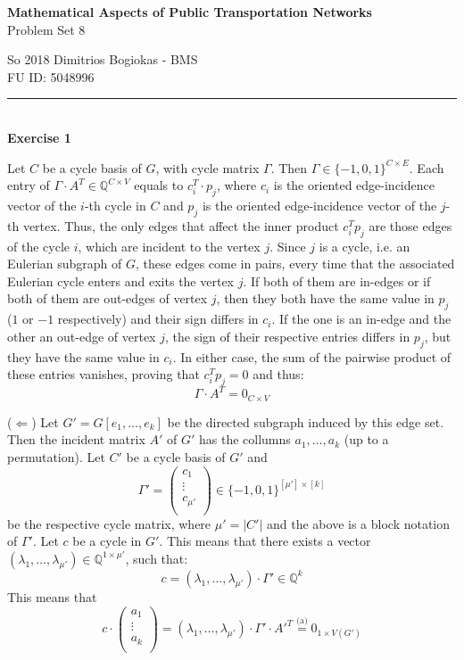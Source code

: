 \documentclass[12pt]{article}
\newenvironment{a_enum}{\begin{enumerate}[label=(\alph{*})]}{\end{enumerate}} %
\newcommand\HRule{\rule{\linewidth}{0.1mm}}
\begin{document}
\begin{center}
{\bf Mathematical Aspects of Public Transportation Networks}\\
Problem Set 8
\end{center}
So 2018 \hfill Dimitrios Bogiokas - BMS\\
\phantom{X}\hfill FU ID: 5048996\\
\HRule\\
{\bf Exercise 1} \begin{a_enum} \item Let $C$ be a cycle basis of $G$, with cycle matrix $\Gamma$. Then $\Gamma\in\{-1,0,1\}^{C\times E}$. Each entry of $\Gamma\cdot A^T\in\mathbb{Q}^{C\times V}$ equals to $c_i^T\cdot p_j$, where $c_i$ is the oriented edge-incidence vector of the $i$-th cycle in $C$ and $p_j$ is the oriented edge-incidence vector of the $j$-th vertex. Thus, the only edges that affect the inner product $c_i^Tp_j$ are those edges of the cycle $i$, which are incident to the vertex $j$. Since $j$ is a cycle, i.e. an Eulerian subgraph of $G$, these edges come in pairs, every time that the associated Eulerian cycle enters and exits the vertex $j$. If both of them are in-edges or if both of them are out-edges of vertex $j$, then they both have the same value in $p_j$ ($1$ or $-1$ respectively) and their sign differs in $c_i$. If the one is an in-edge and the other an out-edge of vertex $j$, the sign of their respective entries differs in $p_j$, but they have the same value in $c_i$. In either case, the sum of the pairwise product of these entries vanishes, proving that $c_i^Tp_j=0$ and thus:
$$\Gamma\cdot A^T = 0_{C\times V}$$
\item ($\Leftarrow$) Let $G'=G[e_1,\ldots,e_k]$ be the directed subgraph induced by this edge set. Then the incident matrix $A'$ of $G'$ has the collumns $a_1,\ldots,a_k$ (up to a permutation). Let $C'$ be a cycle basis of $G'$ and
$$\Gamma'=\left(\begin{array}{c}c_1\\\hline\vdots\\\hline c_{\mu'}\\\end{array}\right)\in\{-1,0,1\}^{[\mu']\times[k]}$$
be the respective cycle matrix, where $\mu'=|C'|$ and the above is a block notation of $\Gamma'$. Let $c$ be a cycle in $G'$. This means that there exists a vector $(\lambda_1,\ldots,\lambda_{\mu'})\in\mathbb{Q}^{1\times\mu'}$, such that:
$$c=(\lambda_1,\ldots,\lambda_{\mu'})\cdot\Gamma'\in\mathbb{Q}^k$$
This means that
$$c\cdot\left(\begin{array}{c}a_1\\\hline\vdots\\\hline a_k\\\end{array}\right)=(\lambda_1,\ldots,\lambda_{\mu'})\cdot\Gamma'\cdot A'^T\overset{\text{(a)}}{=}0_{1\times V(G')}$$

\end{a_enum}
\end{document}
